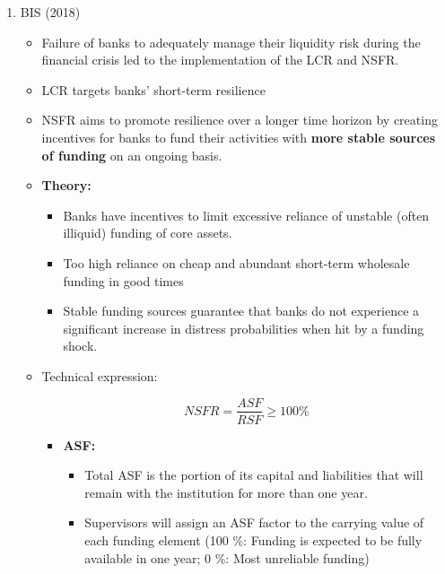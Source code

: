 \documentclass[a4paper,12pt]{article}
\begin{document}
\begin{enumerate}
	\item BIS (2018)
		\begin{itemize}
			\item Failure of banks to adequately manage their liquidity risk during the financial crisis led to the implementation of the LCR and NSFR.

			\item LCR targets banks' short-term resilience

			\item NSFR aims to promote resilience over a longer time horizon by creating incentives for banks to fund their activities with \textbf{more stable sources of funding} on an ongoing basis.

			\item \textbf{Theory:}
			\begin{itemize}
				\item Banks have incentives to limit excessive reliance of unstable (often illiquid) funding of core assets. 

				\item Too high reliance on cheap and abundant short-term wholesale funding in good times

				\item Stable funding sources guarantee that banks do not experience a significant increase in distress probabilities when hit by a funding shock.
			\end{itemize}

			\item Technical expression:

			\begin{equation}
				NSFR = \frac{ASF}{RSF} \geq 100 \%
			\end{equation}

			\begin{itemize}
				\item \textbf{ASF:}
					\begin{itemize}
						\item Total ASF is the portion of its capital and liabilities that will remain with the institution for more than one year. 

						\item Supervisors will assign an ASF factor to the carrying value of each funding element (100 \%: Funding is expected to be fully available in one year; 0 \%: Most unreliable funding)
					\end{itemize}
			
			\end{itemize}

		\end{itemize}
\end{enumerate}

\newpage

\end{document}
